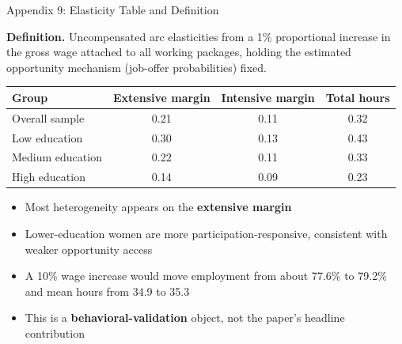 \documentclass[aspectratio=169,11pt]{beamer}
\begin{document}
\begin{frame}{Appendix 9: Elasticity Table and Definition}

\footnotesize
\textbf{Definition.}\; Uncompensated arc elasticities from a 1\% proportional increase in the gross wage attached to all working packages, holding the estimated opportunity mechanism (job-offer probabilities) fixed.

\bigskip
\centering
\begin{tabular}{@{}l ccc@{}}
\toprule
\textbf{Group} & \textbf{Extensive margin} & \textbf{Intensive margin} & \textbf{Total hours} \\
\midrule
Overall sample   & 0.21 & 0.11 & 0.32 \\
Low education    & 0.30 & 0.13 & 0.43 \\
Medium education & 0.22 & 0.11 & 0.33 \\
High education   & 0.14 & 0.09 & 0.23 \\
\bottomrule
\end{tabular}

\bigskip
\begin{itemize}\footnotesize
\item Most heterogeneity appears on the \textbf{extensive margin}
\item Lower-education women are more participation-responsive, consistent with weaker opportunity access
\item A 10\% wage increase would move employment from about 77.6\% to 79.2\% and mean hours from 34.9 to 35.3
\item This is a \textbf{behavioral-validation} object, not the paper's headline contribution
\end{itemize}
\end{frame}
\end{document}
